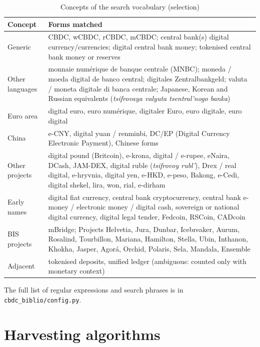 \documentclass[11pt,a4paper]{article}
\begin{document}
\begin{table}[htbp]
\centering\small
\caption{Concepts of the search vocabulary (selection)}\label{tab:vocabulary}
\begin{tabularx}{\linewidth}{@{}lX@{}}
\toprule
\textbf{Concept} & \textbf{Forms matched}\\
\midrule
Generic & CBDC, wCBDC, rCBDC, mCBDC; central bank(s) digital currency/currencies; digital central bank money; tokenised central bank money or reserves\\
Other languages & monnaie numérique de banque centrale (MNBC); moneda / moeda digital de banco central; digitales Zentralbankgeld; valuta / moneta digitale di banca centrale; Japanese, Korean and Russian equivalents (\emph{tsifrovaya valyuta tsentral'nogo banka})\\
Euro area & digital euro, euro numérique, digitaler Euro, euro digitale, euro digital\\
China & e-CNY, digital yuan / renminbi, DC/EP (Digital Currency Electronic Payment), Chinese forms\\
Other projects & digital pound (Britcoin), e-krona, digital / e-rupee, eNaira, DCash, JAM-DEX, digital ruble (\emph{tsifrovoy rubl'}), Drex / real digital, e-hryvnia, digital yen, e-HKD, e-peso, Bakong, e-Cedi, digital shekel, lira, won, rial, e-dirham\\
Early names & digital fiat currency, central bank cryptocurrency, central bank e-money / electronic money / digital cash, sovereign or national digital currency, digital legal tender, Fedcoin, RSCoin, CADcoin\\
BIS projects & mBridge; Projects Helvetia, Jura, Dunbar, Icebreaker, Aurum, Rosalind, Tourbillon, Mariana, Hamilton, Stella, Ubin, Inthanon, Khokha, Jasper, Agorá, Orchid, Polaris, Sela, Mandala, Ensemble\\
Adjacent & tokenised deposits, unified ledger (ambiguous: counted only with monetary context)\\
\bottomrule
\end{tabularx}
\par\smallskip\parbox{0.92\linewidth}{\footnotesize The full list of regular expressions and search phrases is in \texttt{cbdc\_biblio/config.py}.}
\end{table}

\section{Harvesting algorithms}\label{app:harvest}
\end{document}
